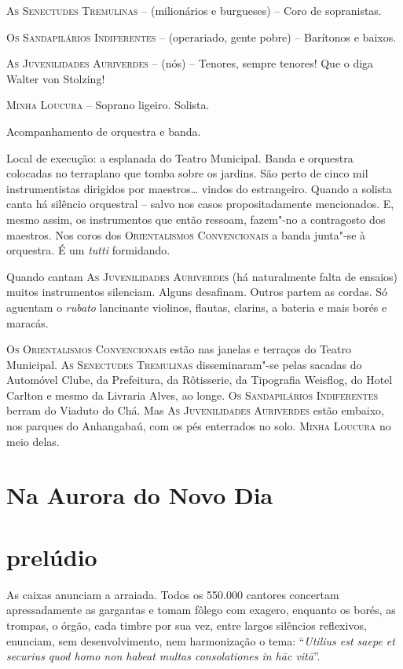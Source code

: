 \textsc{As Senectudes Tremulinas} -- (milionários e burgueses) -- Coro
de sopranistas.

\textsc{Os Sandapilários Indiferentes} -- (operariado, gente pobre) --
Barítonos e baixos.

\textsc{As Juvenilidades Auriverdes} -- (nós) -- Tenores, sempre
tenores! Que o diga Walter von Stolzing!

\textsc{Minha Loucura} -- Soprano ligeiro. Solista.

Acompanhamento de orquestra e banda.

Local de execução: a esplanada do Teatro Municipal. Banda e orquestra
colocadas no terraplano que tomba sobre os jardins. São perto de cinco
mil instrumentistas dirigidos por maestros\ldots{} vindos do estrangeiro.
Quando a solista canta há silêncio orquestral -- salvo nos casos
propositadamente mencionados. E, mesmo assim, os instrumentos que então
ressoam, fazem"-no a contragosto dos maestros. Nos coros dos
\textsc{Orientalismos Convencionais} a banda junta"-se à orquestra. É um
\emph{tutti} formidando.

Quando cantam \textsc{As Juvenilidades Auriverdes} (há
naturalmente falta de ensaios) muitos instrumentos silenciam. Alguns
desafinam. Outros partem as cordas. Só aguentam o \emph{rubato}
lancinante violinos, flautas, clarins, a bateria e mais borés e maracás.

\textsc{Os Orientalismos Convencionais} estão nas janelas e terraços do
Teatro Municipal. \textsc{As Senectudes Tremulinas} disseminaram"-se
pelas sacadas do Automóvel Clube, da Prefeitura, da Rôtisserie, da
Tipografia Weisflog, do Hotel Carlton e mesmo da Livraria Alves, ao
longe. \textsc{Os Sandapilários Indiferentes} berram do Viaduto do Chá.
Mas \textsc{As Juvenilidades Auriverdes} estão embaixo, nos parques do
Anhangabaú, com os pés enterrados no solo. \textsc{Minha Loucura} no
meio delas.

\section*{Na Aurora do Novo Dia}

\section*{prelúdio}

As caixas anunciam a arraiada. Todos os 550.000 cantores concertam
apressadamente as gargantas e tomam fôlego com exagero, enquanto os
borés, as trompas, o órgão, cada timbre por sua vez, entre largos
silêncios reflexivos, enunciam, sem desenvolvimento, nem harmonização o
tema: ``\emph{Utilius est saepe et securius quod homo non habeat multas
consolationes in hāc vitā}''.

